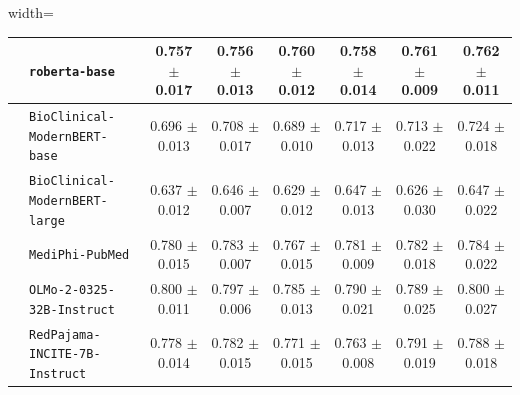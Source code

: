 \begin{table}[!thbp]
\begin{adjustbox}{width=\textwidth}
\begin{tabular}{c lcccccc}
    & \texttt{roberta-base}                  & 0.757 $\pm$ 0.017 & 0.756 $\pm$ 0.013 & 0.760 $\pm$ 0.012 & 0.758 $\pm$ 0.014 & 0.761 $\pm$ 0.009 & 0.762 $\pm$ 0.011 \\
    \midrule
    & \texttt{BioClinical-ModernBERT-base}   & 0.696 $\pm$ 0.013 & 0.708 $\pm$ 0.017 & 0.689 $\pm$ 0.010 & 0.717 $\pm$ 0.013 & 0.713 $\pm$ 0.022 & 0.724 $\pm$ 0.018 \\
    & \texttt{BioClinical-ModernBERT-large}  & 0.637 $\pm$ 0.012 & 0.646 $\pm$ 0.007 & 0.629 $\pm$ 0.012 & 0.647 $\pm$ 0.013 & 0.626 $\pm$ 0.030 & 0.647 $\pm$ 0.022 \\
    & \texttt{MediPhi-PubMed}                & 0.780 $\pm$ 0.015 & 0.783 $\pm$ 0.007 & 0.767 $\pm$ 0.015 & 0.781 $\pm$ 0.009 & 0.782 $\pm$ 0.018 & 0.784 $\pm$ 0.022 \\
    & \texttt{OLMo-2-0325-32B-Instruct}      & 0.800 $\pm$ 0.011 & 0.797 $\pm$ 0.006 & 0.785 $\pm$ 0.013 & 0.790 $\pm$ 0.021 & 0.789 $\pm$ 0.025 & 0.800 $\pm$ 0.027 \\
    & \texttt{RedPajama-INCITE-7B-Instruct}  & 0.778 $\pm$ 0.014 & 0.782 $\pm$ 0.015 & 0.771 $\pm$ 0.015 & 0.763 $\pm$ 0.008 & 0.791 $\pm$ 0.019 & 0.788 $\pm$ 0.018 \\
    \bottomrule
  \end{tabular}
  \end{adjustbox}
\end{table}
